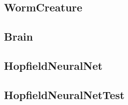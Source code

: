 \documentclass[titlepage, twocolumn, a4paper, 11pt, swedish]{article}
\begin{document}
\subsection{WormCreature}\label{app:WormCreature}
\begin{footnotesize}
  
\end{footnotesize}

\subsection{Brain}\label{app:Brain}
\begin{footnotesize}
  
\end{footnotesize}

\subsection{HopfieldNeuralNet}\label{app:HopfieldNeuralNet}
\begin{footnotesize}
  
\end{footnotesize}

\subsection{HopfieldNeuralNetTest}\label{app:HopfieldNeuralNetTest}
\begin{footnotesize}
  
\end{footnotesize}
\end{document}
